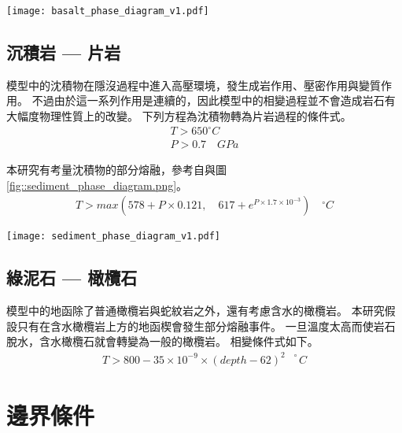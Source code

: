 \begin{figure*}[ht!]
    \centering
    \texttt{[image: basalt\_phase\_diagram\_v1.pdf]}
    \caption{鎂鐵質岩相圖，綠線隔開玄武岩與榴輝岩的穩定場，改編自\citealp{Hacker2003}，橘線為鎂鐵質岩的濕固相線(wet solidus)，改編自\citealp{Gutscher2000Bcan}}
    \label{fig::basalt_phase_diagram}
\end{figure*}

\subsection{沉積岩 --- 片岩}
模型中的沈積物在隱沒過程中進入高壓環境，發生成岩作用、壓密作用與變質作用。
不過由於這一系列作用是連續的，因此模型中的相變過程並不會造成岩石有大幅度物理性質上的改變。
下列方程為沈積物轉為片岩過程的條件式。
\begin{align}
T > 650^{\circ} C\\
P >  0.7 \quad GPa 
\end{align}

本研究有考量沈積物的部分熔融，參考自\citealp{Forster2021}與圖\ref{fig::sediment_phase_diagram.png}。
\begin{align}
    T > max (578+ P \times 0.121,  \quad 617+e^{P\times 1.7\times 10^{-3}}) \quad ^{\circ} C
\end{align}

\begin{figure*}[ht!]
    \centering
    \texttt{[image: sediment\_phase\_diagram\_v1.pdf]}
    \caption{沈積物變質岩相圖，橘線為沈積物濕固相線，改編自\citealp{Forster2021}。}
    \label{fig::sediment_phase_diagram.png}
\end{figure*}


\subsection{綠泥石 --- 橄欖石}

模型中的地函除了普通橄欖岩與蛇紋岩之外，還有考慮含水的橄欖岩。
本研究假設只有在含水橄欖岩上方的地函楔會發生部分熔融事件。
一旦溫度太高而使岩石脫水，含水橄欖石就會轉變為一般的橄欖岩。
相變條件式如下。
\begin{align}
T > 800-35\times 10^{-9}\times (depth-62)^{2  \quad \circ}C
\end{align}

\section{邊界條件}


